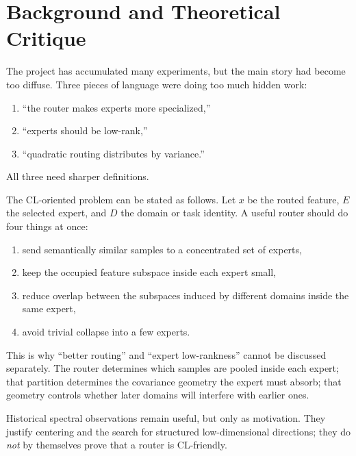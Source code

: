 \documentclass[11pt]{article}
\begin{document}
\section{Background and Theoretical Critique}

The project has accumulated many experiments, but the main story had become too diffuse. Three pieces of language were doing too much hidden work:
\begin{enumerate}
    \item ``the router makes experts more specialized,''
    \item ``experts should be low-rank,''
    \item ``quadratic routing distributes by variance.''
\end{enumerate}

All three need sharper definitions.

The CL-oriented problem can be stated as follows. Let $x$ be the routed feature, $E$ the selected expert, and $D$ the domain or task identity. A useful router should do four things at once:
\begin{enumerate}
    \item send semantically similar samples to a concentrated set of experts,
    \item keep the occupied feature subspace inside each expert small,
    \item reduce overlap between the subspaces induced by different domains inside the same expert,
    \item avoid trivial collapse into a few experts.
\end{enumerate}

This is why ``better routing'' and ``expert low-rankness'' cannot be discussed separately. The router determines which samples are pooled inside each expert; that partition determines the covariance geometry the expert must absorb; that geometry controls whether later domains will interfere with earlier ones.

Historical spectral observations remain useful, but only as motivation. They justify centering and the search for structured low-dimensional directions; they do \emph{not} by themselves prove that a router is CL-friendly.
\end{document}
